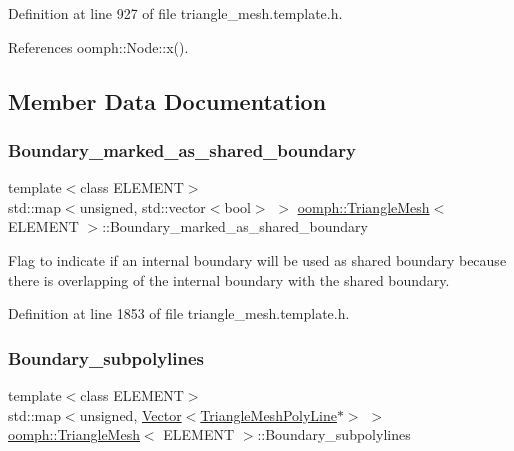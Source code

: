 Definition at line 927 of file triangle\+\_\+mesh.\+template.\+h.



References oomph\+::\+Node\+::x().



\subsection{Member Data Documentation}
\mbox{\label{classoomph_1_1TriangleMesh_acd1571f3189dca349a49a8772cee21d6}} 
\subsubsection{\texorpdfstring{Boundary\+\_\+marked\+\_\+as\+\_\+shared\+\_\+boundary}{Boundary\_marked\_as\_shared\_boundary}}
{\footnotesize\ttfamily template$<$class E\+L\+E\+M\+E\+NT$>$ \\
std\+::map$<$unsigned, std\+::vector$<$bool$>$ $>$ \hyperlink{classoomph_1_1TriangleMesh}{oomph\+::\+Triangle\+Mesh}$<$ E\+L\+E\+M\+E\+NT $>$\+::Boundary\+\_\+marked\+\_\+as\+\_\+shared\+\_\+boundary\hspace{0.3cm}{\ttfamily [protected]}}



Flag to indicate if an internal boundary will be used as shared boundary because there is overlapping of the internal boundary with the shared boundary. 



Definition at line 1853 of file triangle\+\_\+mesh.\+template.\+h.

\mbox{\label{classoomph_1_1TriangleMesh_a4bc8a5ed3d771cec7c9f0de730b28a9f}} 
\subsubsection{\texorpdfstring{Boundary\+\_\+subpolylines}{Boundary\_subpolylines}}
{\footnotesize\ttfamily template$<$class E\+L\+E\+M\+E\+NT$>$ \\
std\+::map$<$unsigned, \hyperlink{classoomph_1_1Vector}{Vector}$<$\hyperlink{classoomph_1_1TriangleMeshPolyLine}{Triangle\+Mesh\+Poly\+Line}$\ast$$>$ $>$ \hyperlink{classoomph_1_1TriangleMesh}{oomph\+::\+Triangle\+Mesh}$<$ E\+L\+E\+M\+E\+NT $>$\+::Boundary\+\_\+subpolylines\hspace{0.3cm}{\ttfamily [protected]}}



